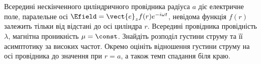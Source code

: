 \begin{problem}
Всередині нескінченного циліндричного провідника радіуса $a$  діє електричне поле, паралельне осі $\Efield = \vect{e}_z f(r)e^{-i\omega t}$, невідома функція $f(r)$  залежить тільки від  відстані до осі циліндра $r$. Всередині провідника провідність $\lambda$, магнітна проникність $\mu = \const$. Знайдіть розподіл густини струму та її асимптотику за високих частот. Окремо оцініть відношення густини струму на осі провідника до значення при $r = a$, а також темп спадання біля краю.
\end{problem}


